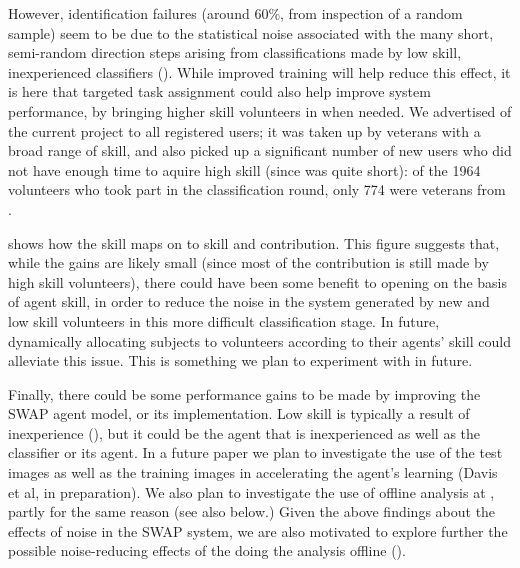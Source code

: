 \documentclass[useAMS,usenatbib,a4paper]{mn2e}
\begin{document}
However, identification failures (around 60\%, from inspection of a random sample)
seem to be due to the statistical noise associated with
the many short, semi-random direction steps arising from classifications made by
low skill, inexperienced
classifiers ().
While improved training will help reduce this effect, it is here
that targeted task assignment could also help improve system performance, by
bringing higher skill volunteers in when needed. We
advertised \StageTwo of the current project to all registered users; it was
taken up by \StageOne veterans with a broad range of skill, and also picked up a
significant number of new users who did not have enough time to aquire high
skill (since \StageTwo was quite short): of the 1964 volunteers who took part in
the \StageTwo classification round, only 774 were veterans from \StageOne.

 shows how the \StageOne
skill maps on to \StageTwo skill and contribution. This figure suggests
that, while the gains are likely small (since  most of the contribution
is still made by high skill volunteers),  there could have been some
benefit to opening \StageTwo on the basis of \StageOne agent skill, in
order to reduce the noise in the system generated by new and low skill
volunteers in this more difficult classification stage.  In future,
dynamically allocating subjects to volunteers according to their agents'
skill could alleviate this issue. This is something we plan to
experiment with in future.

Finally, there could be some performance gains to be made by improving the SWAP
agent model, or its implementation. Low skill is typically a result  of
inexperience (), but it could be the agent that is
inexperienced as well as the classifier or its agent. In a future paper we plan
to investigate the use of the test images as well as the training images in
accelerating the agent's learning (Davis et al, in preparation). We also plan to
investigate the use of offline analysis at \StageOne, partly for the same reason
(see also  below.) Given the above findings  about
the effects of noise in the SWAP system, we are also motivated to explore
further the possible noise-reducing effects of the doing the analysis offline
().
\end{document}
